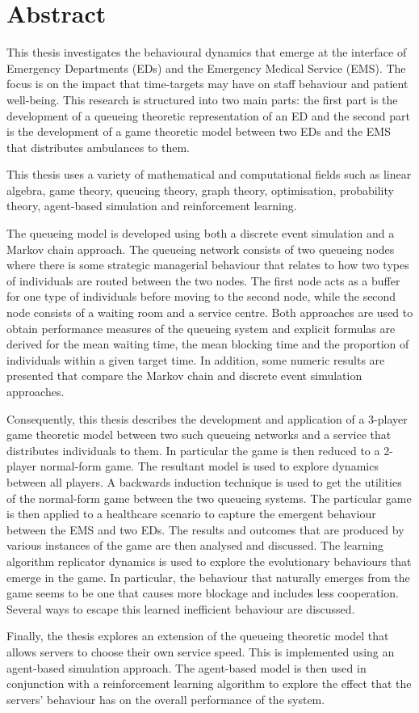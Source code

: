 \chapter*{Abstract}

This thesis investigates the behavioural dynamics that emerge at the
interface of Emergency Departments (EDs) and the Emergency Medical Service
(EMS).
The focus is on the impact that time-targets may have on staff
behaviour and patient well-being.
This research is structured into two main parts: the first part is the
development of a queueing theoretic representation of an ED and the second
part is the development of a game theoretic model between two EDs and the
EMS that distributes ambulances to them.

This thesis uses a variety of mathematical and computational fields such as
linear algebra, game theory, queueing theory, graph theory, optimisation,
probability theory, agent-based simulation and reinforcement learning.

The queueing model is developed using both a discrete event simulation
and a Markov chain approach.
The queueing network consists of two queueing nodes where there is some
strategic managerial behaviour that relates to how two types of individuals
are routed between the two nodes.
The first node acts as a buffer for one type of individuals before moving 
to the second node, while the second node consists of a waiting room and a
service centre.
Both approaches are used to obtain performance measures of the queueing
system and explicit formulas are derived for the mean waiting time, the
mean blocking time and the proportion of individuals within a given target
time.
In addition, some numeric results are presented that compare the
Markov chain and discrete event simulation approaches.

Consequently, this thesis describes the development and application of a
3-player game  theoretic model between two such queueing networks and a
service that distributes individuals to them.
In particular the game is then reduced to a 2-player normal-form game.
The resultant model is used to explore dynamics between all players.
A backwards induction technique is used to get the utilities of the
normal-form game between the two queueing systems.
The particular game is then applied to a healthcare scenario to capture the
emergent behaviour between the EMS and two EDs.
The results and outcomes that are produced by various instances of the game
are then analysed and discussed.
The learning algorithm replicator dynamics is used to explore the
evolutionary behaviours that emerge in the game.
In particular, the behaviour that naturally emerges from the game seems to
be one that causes more blockage and includes less cooperation.
Several ways to escape this learned inefficient behaviour are discussed.

Finally, the thesis explores an extension of the queueing theoretic model
that allows servers to choose their own service speed.
This is implemented using an agent-based simulation approach.
The agent-based model is then used in conjunction with a reinforcement
learning algorithm to explore the effect that the servers' behaviour has 
on the overall performance of the system.

